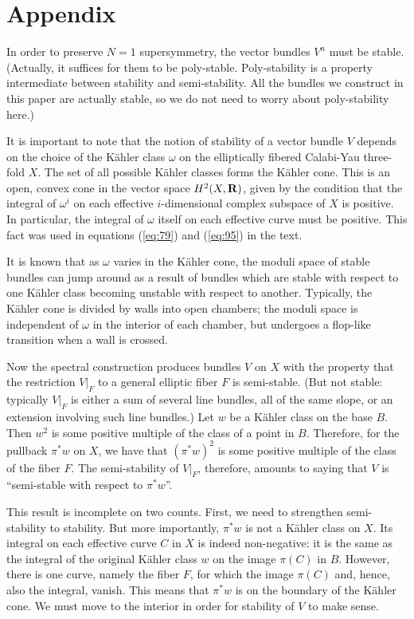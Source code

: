 \documentclass[a4paper,12pt]{article}
\numberwithin{equation}{section}
\theoremstyle{plain}
\begin{document}
\section*{Appendix}

In order to preserve $N=1$ supersymmetry, the vector bundles
$V^{n}$ must be stable. (Actually, it suffices for them to be
poly-stable. Poly-stability is a property intermediate between stability
and semi-stability. All the bundles we construct in this paper
are actually stable, so we do not need to worry about poly-stability here.)

It is important to note that the notion of stability of a vector bundle
$V$ depends on the choice of the K\"{a}hler class $\omega$ on the elliptically
fibered Calabi-Yau
three-fold $X$. The set of all possible K\"{a}hler classes forms the K\"{a}hler cone. 
This is an open, convex cone in the vector space $H^2(X,{\bf R})$, 
given by the condition that the integral of ${\omega}^i$ on each effective 
$i$-dimensional complex subspace of $X$ is positive. In particular, 
the integral of $\omega$ itself on each effective curve must be positive. This
fact was used in equations (\ref{eq:79}) and (\ref{eq:95}) in the text. 


It is known that as $\omega$ varies in the K\"{a}hler cone, the moduli space of stable
bundles can jump around as a result of bundles which are stable with
respect to one K\"{a}hler class becoming unstable with respect to another.
Typically, the K\"{a}hler cone is divided by walls into open chambers; the
moduli space is independent of $\omega$ in the interior of each chamber, but
undergoes a flop-like transition when a wall is crossed.

Now the spectral construction \cite{FMW1,AJ} produces bundles $V$ on $X$ with the
property that the restriction $V {\vert}_F$ to a general elliptic fiber
$F$ is semi-stable. (But not stable: typically $V {\vert}_F$ is 
either a sum of several line bundles, all of the same slope, or an
extension involving such line bundles.) Let $w$ be a K\"{a}hler class on the
base $B$. Then $w^2$ is some positive multiple of the class of a point
in $B$. Therefore, for the pullback ${\pi}^*w$ on $X$, we have that
$({\pi}^*w)^2$ is some positive multiple of the class of the fiber $F$. The
semi-stability of $V {\vert}_F$, therefore, amounts to saying that $V$ is
``semi-stable with respect to ${\pi}^*w$''.

This result is incomplete on two counts. First, we need to strengthen
semi-stability to stability. But more importantly, ${\pi}^*w$ is not
a K\"{a}hler class on $X$. Its integral on each effective curve $C$ in $X$
is indeed non-negative: it is the same as the integral of the original
K\"{a}hler class $w$ on the image $\pi(C)$ in $B$. However, there is one
curve, namely the fiber $F$, for which the image $\pi(C)$ and, hence, also 
the integral, vanish. This means that ${\pi}^*w$ is on the boundary of
the K\"{a}hler cone. We must move to the interior in order for stability of
$V$ to make sense.
\end{document}
